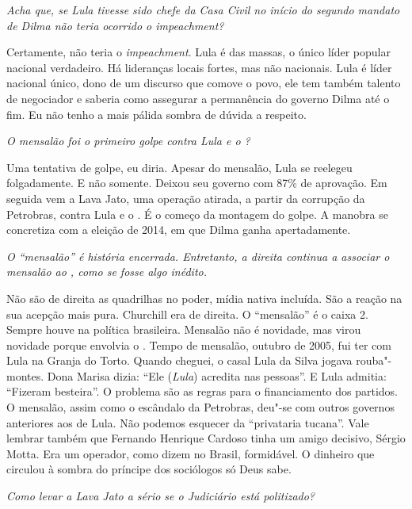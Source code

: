 \itshape
Acha que, se Lula tivesse sido chefe da Casa Civil no
início do segundo mandato de Dilma não teria ocorrido o
\emph{impeachment}?

\normalfont 
Certamente, não teria o \emph{impeachment}. Lula é das
massas, o único líder popular nacional verdadeiro. Há lideranças locais
fortes, mas não nacionais. Lula é líder nacional único, dono de um
discurso que comove o povo, ele tem também talento de negociador e
saberia como assegurar a permanência do governo Dilma até o fim. Eu não
tenho a mais pálida sombra de dúvida a respeito.

\itshape
O mensalão foi o primeiro golpe contra Lula e o ?

\normalfont 
Uma tentativa de golpe, eu diria. Apesar do mensalão,
Lula se reelegeu folgadamente. E não somente. Deixou seu governo com
87\% de aprovação. Em seguida vem a Lava Jato, uma operação atirada, a
partir da corrupção da Petrobras, contra Lula e o . É o começo da
montagem do golpe. A manobra se concretiza com a eleição de 2014, em que
Dilma ganha apertadamente.

\itshape
O ``mensalão'' é história encerrada. Entretanto, a
direita continua a associar o mensalão ao , como se fosse algo
inédito.

\normalfont 
Não são de direita as quadrilhas no poder, mídia nativa
incluída. São a reação na sua acepção mais pura. Churchill era de
direita. O ``mensalão'' é o caixa 2. Sempre houve na política
brasileira. Mensalão não é novidade, mas virou novidade porque envolvia
o . Tempo de mensalão, outubro de 2005, fui ter com Lula na Granja do
Torto. Quando cheguei, o casal Lula da Silva jogava rouba"-montes. Dona
Marisa dizia: ``Ele (\emph{Lula}) acredita nas pessoas''. E Lula
admitia: ``Fizeram besteira''. O problema são as regras para o
financiamento dos partidos. O mensalão, assim como o escândalo da
Petrobras, deu"-se com outros governos anteriores aos de Lula. Não
podemos esquecer da ``privataria tucana''. Vale lembrar também que
Fernando Henrique Cardoso tinha um amigo decisivo, Sérgio Motta. Era um
operador, como dizem no Brasil, formidável. O dinheiro que circulou à
sombra do príncipe dos sociólogos só Deus sabe.

\itshape
Como levar a Lava Jato a sério se o Judiciário está
politizado?


